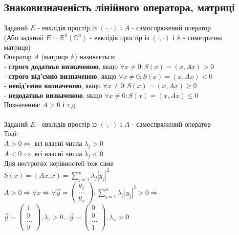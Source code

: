 \subsection{Знаковизначеність лінійного оператора, матриці}
Заданий $E$ - евклідів простір із $(\cdot,\cdot)$ і $A$ - самоспряжений оператор\\
(Або заданий $E = \mathbb{R}^n (\mathbb{C}^n)$ - евклідів простір із $(\cdot,\cdot)$ і $\mathbb{A}$ - симетрична матриця)\\
 Оператор $A$ (матриця $\mathbb{A}$) називається:\\
- \textbf{строго додатньо визначеною}, якщо $\forall x \neq 0: S(x) = (x,Ax) > 0$\\
- \textbf{строго від'ємно визначеною}, якщо $\forall x \neq 0: S(x) = (x,Ax) < 0$\\
- \textbf{невід'ємно визначеною}, якщо $\forall x \neq 0: S(x) = (x,Ax) \geq 0$\\
- \textbf{недодатньо визначеною}, якщо $\forall x \neq 0: S(x) = (x,Ax) \leq 0$\\
Позначення: $A > 0$ і т.д.
\bigskip \\
\\
Заданий $E$ - евклідів простір із $(\cdot,\cdot)$ і $A$ - самоспряжений оператор\\
Тоді:\\
$A > 0 \iff$ всі власні числа $\lambda_j > 0$\\
$A < 0 \iff$ всі власні числа $\lambda_j < 0$\\
Для нестрогих нерівностей теж саме\\
\proof
$S(x) = (Ax,x) = \displaystyle \sum_{j=1}^n \lambda_j |y_j|^2$\\
$A > 0 \Rightarrow \forall x \Rightarrow \forall \vec{y} = \begin{pmatrix}
y_1 \\ \dots \\ y_n
\end{pmatrix}: \displaystyle \sum_{j=1}^n \lambda_j |y_j|^2 > 0 \Rightarrow$\\
$\vec{y} = \begin{pmatrix}
1 \\ 0 \\ \dots \\ 0
\end{pmatrix}, \lambda_1 > 0 \dots \vec{y} = \begin{pmatrix}
0 \\ 0 \\ \dots \\ 1
\end{pmatrix}, \lambda_n > 0$\\
